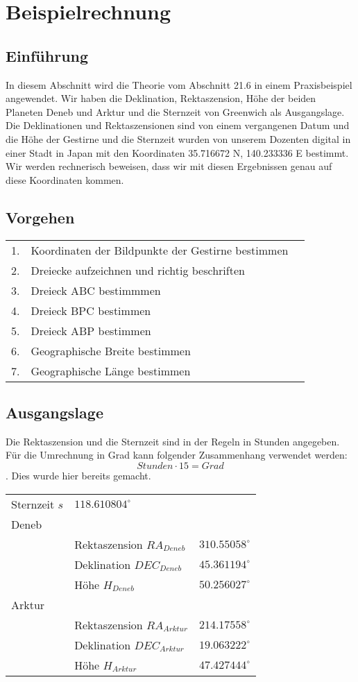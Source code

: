\section{Beispielrechnung}

\subsection{Einführung}
In diesem Abschnitt wird die Theorie vom Abschnitt 21.6 in einem Praxisbeispiel angewendet. 
Wir haben die Deklination, Rektaszension, Höhe der beiden Planeten Deneb und Arktur und die Sternzeit von Greenwich als Ausgangslage.
Die Deklinationen und Rektaszensionen sind von einem vergangenen Datum und die Höhe der Gestirne und die Sternzeit wurden von unserem Dozenten digital in einer Stadt in Japan mit den Koordinaten 35.716672 N, 140.233336 E bestimmt.
Wir werden rechnerisch beweisen, dass wir mit diesen Ergebnissen genau auf diese Koordinaten kommen.
\subsection{Vorgehen}

\begin{center}
	\begin{tabular}{l l l}
		1. & Koordinaten der Bildpunkte der Gestirne bestimmen \\
		2. & Dreiecke aufzeichnen und richtig beschriften\\
		3. & Dreieck ABC bestimmmen\\
		4. & Dreieck BPC bestimmen \\
		5. & Dreieck ABP bestimmen \\ 
		6. & Geographische Breite bestimmen \\
		7. & Geographische Länge bestimmen \\
	\end{tabular}
\end{center}

\subsection{Ausgangslage}
Die Rektaszension und die Sternzeit sind in der Regeln in Stunden angegeben.
Für die Umrechnung in Grad kann folgender Zusammenhang verwendet werden:
\[ Stunden \cdot 15 = Grad\].
Dies wurde hier bereits gemacht.
\begin{center}
	\begin{tabular}{l l l}
		Sternzeit $s$ & $118.610804^\circ$ \\
		Deneb&\\
		& Rektaszension $RA_{Deneb}$& $310.55058^\circ$ \\
		& Deklination $DEC_{Deneb}$& $45.361194^\circ$ \\
		& Höhe $H_{Deneb}$ & $50.256027^\circ$ \\ 
		Arktur &\\
		& Rektaszension $RA_{Arktur}$& $214.17558^\circ$ \\
		& Deklination $DEC_{Arktur}$& $19.063222^\circ$ \\
		& Höhe $H_{Arktur}$ & $47.427444^\circ$ \\  
	\end{tabular}
\end{center}
